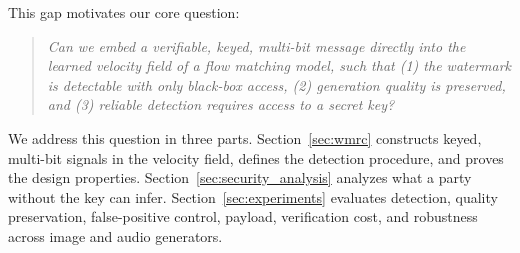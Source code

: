 \documentclass[11pt]{article}
\begin{document}
This gap motivates our core question:
\begin{quote}
\emph{Can we embed a verifiable, keyed, multi-bit message directly into
the learned velocity field of a flow matching model, such that (1) the
watermark is detectable with only black-box access, (2) generation
quality is preserved, and (3) reliable detection requires access to a
secret key?}
\end{quote}

We address this question in three parts. Section~\ref{sec:wmrc}
constructs keyed, multi-bit signals in the velocity field, defines the
detection procedure, and proves the design properties. Section~\ref{sec:security_analysis}
analyzes what a party without the key can infer. Section~\ref{sec:experiments}
evaluates detection, quality preservation, false-positive control,
payload, verification cost, and robustness across image and audio
generators.
\end{document}
